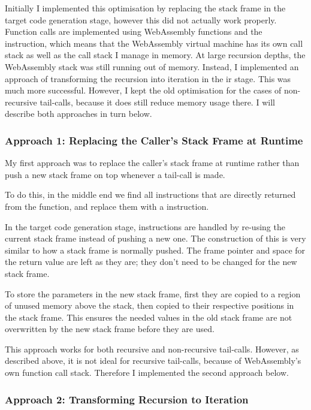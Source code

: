 \documentclass[00-main.tex]{subfiles}
\begin{document}
Initially I implemented this optimisation by replacing the stack frame in the target code generation stage, however this did not actually work properly.
Function calls are implemented using WebAssembly functions and the  instruction, which means that the WebAssembly virtual machine has its own call stack as well as the call stack I manage in memory.
At large recursion depths, the WebAssembly stack was still running out of memory.
Instead, I implemented an approach of transforming the recursion into iteration in the \gls{ir} stage.
This was much more successful.
However, I kept the old optimisation for the cases of non-recursive tail-calls, because it does still reduce memory usage there.
I will describe both approaches in turn below.

\subsubsection{Approach 1: Replacing the Caller's Stack Frame at Runtime}

My first approach was to replace the caller's stack frame at runtime rather than push a new stack frame on top whenever a tail-call is made.

To do this, in the middle end we find all  instructions that are directly returned from the function, and replace them with a  instruction.

In the target code generation stage,  instructions are handled by re-using the current stack frame instead of pushing a new one.
The construction of this is very similar to how a stack frame is normally pushed.
The frame pointer and space for the return value are left as they are; they don't need to be changed for the new stack frame.

To store the parameters in the new stack frame, first they are copied to a region of unused memory above the stack, then copied to their respective positions in the stack frame. This ensures the needed values in the old stack frame are not overwritten by the new stack frame before they are used.

This approach works for both recursive and non-recursive tail-calls.
However, as described above, it is not ideal for recursive tail-calls, because of WebAssembly's own function call stack.
Therefore I implemented the second approach below.

\subsubsection{Approach 2: Transforming Recursion to Iteration}
\end{document}
